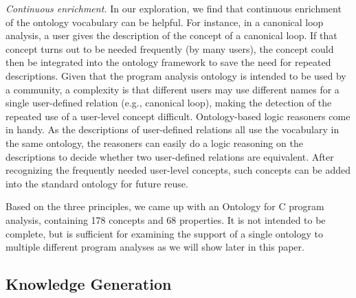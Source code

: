 {\em Continuous enrichment.}  In our exploration, we find that
continuous enrichment of the ontology vocabulary can be helpful. For
instance, in a canonical loop analysis, a user gives the description
of the concept of a canonical loop.  If that concept turns out to be
needed frequently (by many users), the concept could then be
integrated into the ontology framework to save the need for repeated
descriptions. Given that the program analysis ontology is intended to
be used by a community, a complexity is that different users may use
different names for a single user-defined relation (e.g., canonical
loop), making the detection of the repeated use of a user-level
concept difficult. Ontology-based logic reasoners come in handy. As the
descriptions of user-defined relations all use the vocabulary in the
same ontology, the reasoners can easily do a logic reasoning on the
descriptions to decide whether two user-defined relations are
equivalent. After recognizing the frequently needed user-level
concepts, such concepts can be added into the standard ontology for
future reuse.  

Based on the three principles, we came up with an Ontology for C
program analysis, containing 178 concepts and 68 properties. It is not intended to be complete, but is sufficient for
examining the support of a single ontology to multiple different
program analyses as we will show later in this paper. 

\subsection{Knowledge Generation} %

